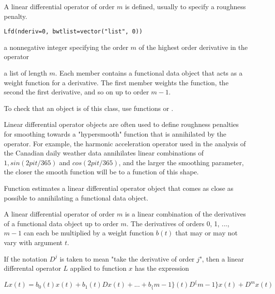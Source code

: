 \begin{Description}\relax
A linear differential operator of order $m$ is defined,
usually to specify a roughness penalty.
\end{Description}
\begin{Usage}
\begin{verbatim}
Lfd(nderiv=0, bwtlist=vector("list", 0))
\end{verbatim}
\end{Usage}
\begin{Arguments}
\begin{ldescription}
\item[\code{nderiv}] a nonnegative integer specifying the order $m$ of the
highest order derivative in the operator

\item[\code{bwtlist}] a list of length $m$.  Each member contains a
functional data object that acts as a weight function for a
derivative.  The first member weights the function, the
second the first derivative, and so on up to order $m-1$.

\end{ldescription}
\end{Arguments}
\begin{Details}\relax
To check that an object is of this class, use functions
 or .

Linear differential operator objects are often used to
define roughness penalties for smoothing towards a
"hypersmooth" function that is annihilated by the operator.
For example, the harmonic acceleration operator used in the
analysis of the Canadian daily weather data annihilates linear
combinations of $1, sin(2 pi t/365)$ and $cos(2 pi t/365)$,
and the larger the smoothing parameter, the closer the smooth
function will be to a function of this shape.

Function  estimates a linear differential
operator object that comes as close as possible to annihilating
a functional data object.

A linear differential operator of order $m$ is a
linear combination of the derivatives of a functional
data object up to order $m$.  The derivatives of
orders 0, 1, ..., $m-1$ can each be multiplied
by a weight function $b(t)$ that may or may not vary with
argument $t$.

If the notation $D^j$ is taken to
mean "take the derivative of order $j$", then a linear
differental operator $L$ applied to function $x$
has the expression

$Lx(t) = b_0(t) x(t) + b_1(t)Dx(t) + ... + b_\{m-1\}(t) D^\{m-1\} x(t)
+ D^mx(t)$
\end{Details}

